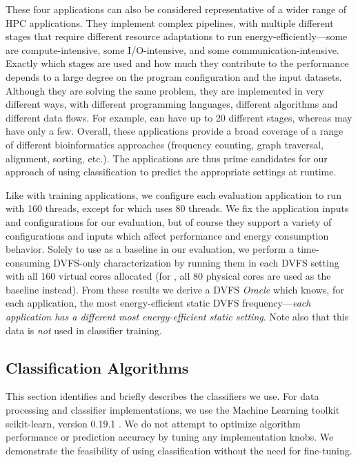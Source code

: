 These four applications can also be considered representative of a wider range of HPC applications.
They implement complex pipelines, with multiple different stages that require different resource adaptations to run energy-efficiently---some are compute-intensive, some I/O-intensive, and some communication-intensive.
Exactly which stages are used and how much they contribute to the performance depends to a large degree on the program configuration and the input datasets.
Although they are solving the same problem, they are implemented in very different ways, with different programming languages, different algorithms and different data flows.
For example,  can have up to 20 different stages, whereas  may have only a few.
Overall, these applications provide a broad coverage of a range of different bioinformatics approaches (frequency counting, graph traversal, alignment, sorting, etc.).
The applications are thus prime candidates for our approach of using classification to predict the appropriate settings at runtime.

Like with training applications, we configure each evaluation application to run with 160 threads, except for  which uses 80 threads.
We fix the application inputs and configurations for our evaluation, but of course they support a variety of configurations and inputs which affect performance and energy consumption behavior.
Solely to use as a baseline in our evaluation, we perform a time-consuming DVFS-only characterization by running them in each DVFS setting with all 160 virtual cores allocated (for , all 80 physical cores are used as the baseline instead).
From these results we derive a DVFS \emph{Oracle} which knows, for each application, the most energy-efficient static DVFS frequency---\emph{each application has a different most energy-efficient static setting}.
Note also that this data is \emph{not} used in classifier training.


\subsection{Classification Algorithms}

This section identifies and briefly describes the classifiers we use.
For data processing and classifier implementations, we use the Machine Learning toolkit scikit-learn, version 0.19.1 \cite{scikit-learn}.
We do not attempt to optimize algorithm performance or prediction accuracy by tuning any implementation knobs.
We demonstrate the feasibility of using classification without the need for fine-tuning.

